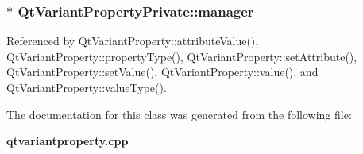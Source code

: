 \subsubsection[{manager}]{$\ast$ Qt\+Variant\+Property\+Private\+::manager}\label{classQtVariantPropertyPrivate_a2e22b94789e1555cf85479906f164adb}


Referenced by Qt\+Variant\+Property\+::attribute\+Value(), Qt\+Variant\+Property\+::property\+Type(), Qt\+Variant\+Property\+::set\+Attribute(), Qt\+Variant\+Property\+::set\+Value(), Qt\+Variant\+Property\+::value(), and Qt\+Variant\+Property\+::value\+Type().



The documentation for this class was generated from the following file\+:\begin{DoxyCompactItemize}
\item 
{\bf qtvariantproperty.\+cpp}\end{DoxyCompactItemize}
